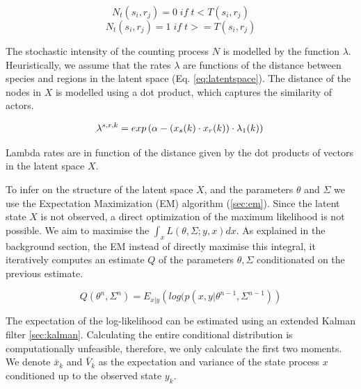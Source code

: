 \documentclass[mscthesis]{usiinfthesis}
\begin{document}
\[
N_t(s_i, r_j) = 0 \; if \; t < T(s_i, r_j)
\]
\[
N_t(s_i, r_j) = 1 \; if \; t >= T(s_i, r_j)
\]

The stochastic intensity of the counting process $N$ is modelled by the function $\lambda$. Heuristically, we assume that the rates $\lambda$ are functions of the distance between species and regions in the latent space (Eq. \ref{eq:latentspace}). The distance of the nodes in $X$ is modelled using a dot product, which captures the similarity of actors.

\begin{eqfloat}
\begin{equation}
\lambda^{s, r, k} = exp\left(\alpha-(x_s(k) \cdot x_r(k)) \cdot \lambda_1(k) \right) \\
\label{eq:ourmodel_lambda}
\end{equation}
\caption{Lambda rates are in function of the distance given by the dot products of vectors in the latent space $X$.}
\end{eqfloat}

To infer on the structure of the latent space $X$, and the parameters $\theta$  and $\Sigma$ we use the Expectation Maximization (EM) algorithm (\ref{sec:em}). Since the latent state $X$ is not observed, a direct optimization of the maximum likelihood is not possible. We aim to maximise the $\int_x L(\theta, \Sigma ; y, x) dx$. As explained in the background section, the EM instead of directly maximise this integral, it iteratively computes an estimate $Q$ of the parameters $\theta, \Sigma$ conditionated on the previous estimate. 

\[
Q(\theta^{n}, \Sigma^{n}) = E_{x|y} \left( log(p(x, y | \theta^{n-1}, \Sigma^{n-1}) \right)
\]

The expectation of the log-likelihood can be estimated using an extended Kalman filter \ref{sec:kalman}. Calculating the entire conditional distribution is computationally unfeasible, therefore, we only calculate the first two moments. We denote $\bar{x}_{k}$ and $\bar{V}_{k}$ as the expectation and variance of the state process $x$ conditioned up to the observed state $y_k$. 




\end{document}
